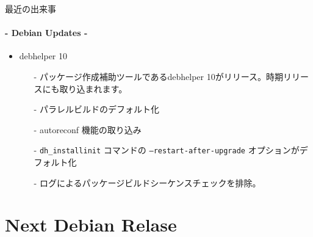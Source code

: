 \documentclass[cjk,dvipdfmx,14pt,compress,fragile]{beamer}
\begin{document}
\begin{frame}[c,fragile]{最近の出来事}
  \framesubtitle{- Debian Updates -}

  \begin{itemize}[<+->]
  \item debhelper 10
    \begin{itemize}[<+->]
    \item[-] %
    パッケージ作成補助ツールであるdebhelper 10がリリース。時期リリースにも取り込まれます。
    \item[-] %
      パラレルビルドのデフォルト化
    \item[-]
      autoreconf 機能の取り込み
    \item[-]
      \texttt{dh\_installinit} コマンドの
      \texttt{--restart-after-upgrade} オプションがデフォルト化
    \item[-]
      ログによるパッケージビルドシーケンスチェックを排除。
    \end{itemize}
  \end{itemize}
\end{frame}


\section{Next Debian Relase}

\end{document}
